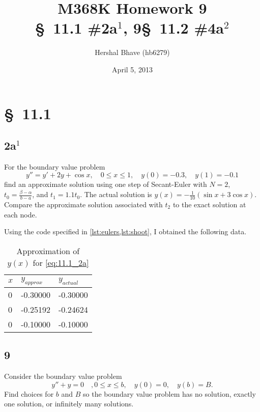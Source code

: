 \documentclass[12pt]{article}
\title{M368K Homework 9 \\
  \normalsize{\S~11.1 \#2a$^1$, 9\quad \S~11.2 \#4a$^2$}}
\author{Hershal Bhave (hb6279)}
\date{April 5, 2013}
\begin{document}
\maketitle

\section{\S~11.1}
\subsection{2a$^1$}
For the boundary value problem 
\begin{equation}
  \label{eq:11.1_2a}
  y''=y'+2y+\cos x,\quad 0\leq x \leq 1,\quad y(0)=-0.3,\quad y(1)=-0.1
\end{equation}
find an approximate solution using one step of Secant-Euler with
$N=2$, $t_0=\frac{\beta-\alpha}{b-a}$, and $t_1=1.1t_0$. The actual
solution is $y(x)=-\frac{1}{10}(\sin x + 3\cos x)$. Compare the
approximate solution associated with $t_2$ to the exact solution at
each node.

Using the code specified in \cref{lst:eulers,lst:shoot}, I obtained the following
data.

\begin{table}[h]
  \centering
  \begin{tabularx}{.5\textwidth}{XXX}
    \hline
    $x$ & $y_{approx}$ & $y_{actual}$ \\
    \hline
    0 &    -0.30000 &     -0.30000 \\
    0 &    -0.25192 &     -0.24624 \\
    0 &    -0.10000 &     -0.10000 \\
    \hline           
  \end{tabularx}
  \caption{Approximation of $y(x)$ for \cref{eq:11.1_2a}}
  \label{tab:2a_data}
\end{table}

\subsection{9}
Consider the boundary value problem 
\begin{equation}
  \label{eq:11.1_9}
  y''+y=0\quad, 0\leq x\leq b,\quad y(0)=0,\quad y(b)=B.
\end{equation}
Find choices for $b$ and $B$ so the boundary value problem has no solution, exactly one solution, or infinitely many solutions.
\end{document}
